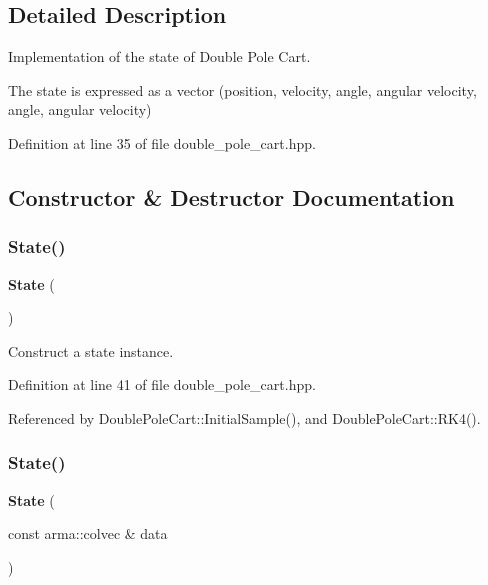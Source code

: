 \subsection{Detailed Description}
Implementation of the state of Double Pole Cart. 

The state is expressed as a vector (position, velocity, angle, angular velocity, angle, angular velocity) 

Definition at line 35 of file double\+\_\+pole\+\_\+cart.\+hpp.



\subsection{Constructor \& Destructor Documentation}
\mbox{\label{classmlpack_1_1rl_1_1DoublePoleCart_1_1State_a790355057d12e9c1ce7643551c16fecd}} 
\subsubsection{State()\hspace{0.1cm}{\footnotesize\ttfamily [1/2]}}
{\footnotesize\ttfamily \textbf{ State} (\begin{DoxyParamCaption}{ }\end{DoxyParamCaption})\hspace{0.3cm}{\ttfamily [inline]}}



Construct a state instance. 



Definition at line 41 of file double\+\_\+pole\+\_\+cart.\+hpp.



Referenced by Double\+Pole\+Cart\+::\+Initial\+Sample(), and Double\+Pole\+Cart\+::\+R\+K4().

\mbox{\label{classmlpack_1_1rl_1_1DoublePoleCart_1_1State_a8bc7967f6d91a3c94f9b3f502297a926}} 
\subsubsection{State()\hspace{0.1cm}{\footnotesize\ttfamily [2/2]}}
{\footnotesize\ttfamily \textbf{ State} (\begin{DoxyParamCaption}\item[{const arma\+::colvec \&}]{data }\end{DoxyParamCaption})\hspace{0.3cm}{\ttfamily [inline]}}




